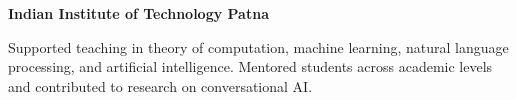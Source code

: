 \textbf{Indian Institute of Technology Patna}\par
Supported teaching in theory of computation, machine learning, natural language processing, and artificial intelligence. Mentored students across academic levels and contributed to research on conversational AI.
